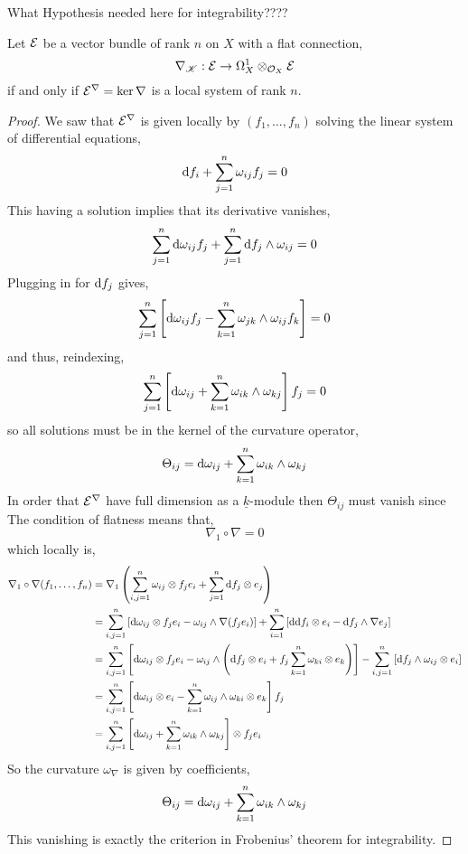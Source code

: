 \documentclass[12pt]{article}
\begin{document}
\begin{rmk}
What Hypothesis needed here for integrability????
\end{rmk}

\begin{proposition}
Let $\mathcal{E}$ be a vector bundle of rank $n$ on $X$ with a flat connection,
\[ \nabla_{\mathscr{K}} : \mathcal{E} \to \Omega^1_X \otimes_{\mathcal{O}_{X}} \mathcal{E}   \]
if and only if $\mathcal{E}^\nabla = \ker{\nabla}$ is a local system of rank $n$. 
\end{proposition}

\begin{proof}
We saw that $\mathcal{E}^\nabla$ is given locally by $(f_1, \dots, f_n)$ solving the linear system of differential equations,
\[ \mathrm{d}{f_i} + \sum_{j = 1}^n \omega_{ij} f_j = 0 \]
This having a solution implies that its derivative vanishes,
\[ \sum_{j = 1}^n \mathrm{d}{\omega_{ij}} f_j + \sum_{j = 1}^n \mathrm{d}{f_j} \wedge \omega_{ij} = 0 \]
Plugging in for $\mathrm{d}{f_j}$ gives,
\[ \sum_{j = 1}^n \left[ \mathrm{d}{\omega_{ij}} f_j - \sum_{k = 1}^n \omega_{jk} \wedge \omega_{ij} f_k \right]  = 0 \]
and thus, reindexing,
\[ \sum_{j = 1}^n \left[ \mathrm{d}{\omega_{ij}} + \sum_{k = 1}^n \omega_{ik} \wedge \omega_{kj} \right] f_j = 0 \]
so all solutions must be in the kernel of the curvature operator,
\[ \Theta_{ij} = \mathrm{d}{\omega_{ij}} + \sum_{k = 1}^n \omega_{ik} \wedge \omega_{kj} \]
In order that $\mathcal{E}^\nabla$ have full dimension as a $\underline{k}$-module then $\Theta_{ij}$ must vanish since 
The condition of flatness means that,
\[ \nabla_1 \circ \nabla = 0 \]
which locally is,
\begin{align*}
\nabla_1 \circ \nabla (f_1, \dots, f_n) & = \nabla_1 \left( \sum_{i,j = 1}^n \omega_{ij} \otimes f_j e_i + \sum_{j = 1}^n \mathrm{d}{f_j} \otimes e_j  \right) 
\\
& = \sum_{i,j = 1}^n \left[ \mathrm{d}{\omega_{ij}} \otimes f_j e_i - \omega_{ij} \wedge \nabla (f_j e_i) \right]  + \sum_{i = 1}^n \left[ \mathrm{d} \mathrm{d} f_i \otimes e_i - \mathrm{d}{f_j} \wedge \nabla e_j \right]
\\
& = \sum_{i,j = 1}^n \left[ \mathrm{d}{\omega_{ij}} \otimes f_j e_i - \omega_{ij} \wedge  \left(  \mathrm{d}{f_j} \otimes e_i  + f_j \sum_{k = 1}^n \omega_{ki} \otimes e_k \right) \right]  - \sum_{i,j = 1}^n \left[ \mathrm{d}{f_j} \wedge \omega_{ij} \otimes e_i  \right]
\\
& = \sum_{i,j = 1}^n  \left[ \mathrm{d}{\omega_{ij}} \otimes  e_i -  \sum_{k = 1}^n \omega_{ij} \wedge \omega_{ki} \otimes e_k \right] f_j
\\
& = \sum_{i,j = 1}^n \left[ \mathrm{d}{\omega_{ij}} + \sum_{k = 1}^n \omega_{ik} \wedge \omega_{kj} \right] \otimes f_j e_i
\end{align*}
So the curvature $\omega_\nabla$ is given by coefficients,
\[ \Theta_{ij} = \mathrm{d}{\omega_{ij}} + \sum_{k = 1}^n \omega_{ik} \wedge \omega_{kj} \]
This vanishing is exactly the criterion in Frobenius' theorem for integrability.
\end{proof}
\end{document}
